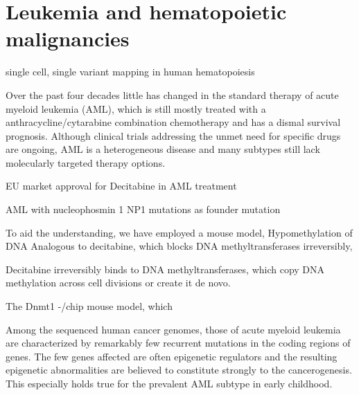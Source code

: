 \chapter{Leukemia and hematopoietic malignancies} 
\minitoc
\label{chap:i:leukemia:introduction}


single cell, single variant mapping in human hematopoiesis\cite{Ulirsch2019}

Over the past four decades little has changed in the standard therapy of acute myeloid leukemia (AML), which is still mostly treated with a anthracycline/cytarabine combination chemotherapy\cite{Cohen1977} and has a dismal survival prognosis. Although clinical trials addressing the unmet need for specific drugs are ongoing\cite{beatAML}, AML is a heterogeneous disease and many subtypes still lack molecularly targeted therapy options. 

EU market approval for Decitabine in AML treatment\cite{Nieto2016}	

AML with nucleophosmin 1 NP1 mutations as founder mutation\cite{Cocciardi2019}

To aid the understanding, we have employed a mouse model, 
Hypomethylation of DNA Analogous to decitabine, which blocks DNA methyltransferases irreversibly, 



Decitabine irreversibly binds to DNA methyltransferases, which copy DNA methylation across cell divisions or create it de novo. 

The Dnmt1 -/chip mouse model, which 

Among the sequenced human cancer genomes, those of acute myeloid leukemia are characterized by remarkably few recurrent mutations in the coding regions of genes\cite{Kandoth2013,TCGAC2013}. The few genes affected are often epigenetic regulators\cite{Plass2013,Shen2013} and the resulting epigenetic abnormalities are believed to constitute strongly to the cancerogenesis\cite{Wen2018}. This especially holds true for the prevalent AML subtype in early childhood\cite{Schafer2010}. 

